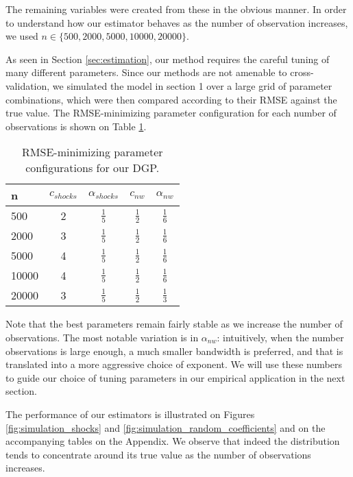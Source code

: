 The remaining variables were created from these in the obvious manner. In order to understand how our estimator behaves as the number of observation increases, we used $n \in \{500, 2000, 5000, 10000, 20000 \}$.

As seen in Section \ref{sec:estimation}, our method requires the careful tuning of many different parameters. Since our methods are not amenable to cross-validation, we simulated the model in section 1 over a large grid of parameter combinations, which were then compared according to their RMSE against the true value. The RMSE-minimizing parameter configuration for each number of observations is shown on Table \ref{tab:best_parameters}. 

\begin{table}[htdp]
  \centering
  \renewcommand{\arraystretch}{1.6}
  \begin{tabular}{l|cccc}
    n & $c_{shocks}$ & $\alpha_{shocks}$ & $c_{nw}$ & $\alpha_{nw}$ \\  \hline
    500 & 2 & $\frac{1}{5}$ & $\frac{1}{2}$ & $\frac{1}{6}$ \\
    2000 & 3 & $\frac{1}{5}$ & $\frac{1}{2}$ & $\frac{1}{6}$ \\
    5000 & 4 & $\frac{1}{5}$ & $\frac{1}{2}$ & $\frac{1}{6}$ \\
    10000 & 4 & $\frac{1}{5}$ & $\frac{1}{2}$ & $\frac{1}{6}$ \\
    20000 & 3 & $\frac{1}{5}$ & $\frac{1}{2}$ & $\frac{1}{3}$ \\
  \end{tabular}
  \caption{RMSE-minimizing parameter configurations for our DGP.}
  \label{tab:best_parameters}
\end{table}
 
Note that the best parameters remain fairly stable as we increase the number of observations. The most notable variation is in $\alpha_{nw}$: intuitively, when the number observations is large enough, a much smaller bandwidth is preferred, and that is translated into a more aggressive choice of exponent. We will use these numbers to guide our choice of tuning parameters in our empirical application in the next section.

The performance of our estimators is illustrated on Figures \ref{fig:simulation_shocks} and \ref{fig:simulation_random_coefficients} and on the accompanying tables on the Appendix. We observe that indeed the distribution tends to concentrate around its true value as the number of observations increases. 


